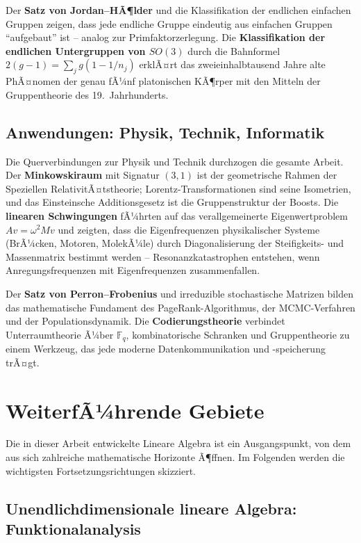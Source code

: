 ﻿\documentclass[a4paper,12pt]{report}
\theoremstyle{definition}
\begin{document}
Der \textbf{Satz von Jordan--HÃ¶lder} und die Klassifikation der
endlichen einfachen Gruppen zeigen, dass jede endliche Gruppe
eindeutig aus einfachen Gruppen ``aufgebaut'' ist -- analog zur
Primfaktorzerlegung. Die \textbf{Klassifikation der endlichen
Untergruppen von $SO(3)$} durch die Bahnformel
$2(g-1) = \sum_j g(1 - 1/n_j)$ erklÃ¤rt das zweieinhalbtausend
Jahre alte PhÃ¤nomen der genau fÃ¼nf platonischen KÃ¶rper mit den
Mitteln der Gruppentheorie des 19.~Jahrhunderts.

\subsection*{Anwendungen: Physik, Technik, Informatik}

Die Querverbindungen zur Physik und Technik durchzogen die gesamte
Arbeit. Der \textbf{Minkowskiraum} mit Signatur $(3,1)$ ist der
geometrische Rahmen der Speziellen RelativitÃ¤tstheorie;
Lorentz-Transformationen sind seine Isometrien, und das
Einsteinsche Additionsgesetz ist die Gruppenstruktur der Boosts.
Die \textbf{linearen Schwingungen} fÃ¼hrten auf das verallgemeinerte
Eigenwertproblem $Av = \omega^2 Mv$ und zeigten, dass die
Eigenfrequenzen physikalischer Systeme (BrÃ¼cken, Motoren, MolekÃ¼le)
durch Diagonalisierung der Steifigkeits- und Massenmatrix bestimmt
werden -- Resonanzkatastrophen entstehen, wenn Anregungsfrequenzen
mit Eigenfrequenzen zusammenfallen.

Der \textbf{Satz von Perron--Frobenius} und irreduzible stochastische
Matrizen bilden das mathematische Fundament des PageRank-Algorithmus,
der MCMC-Verfahren und der Populationsdynamik. Die \textbf{Codierungstheorie}
verbindet Unterraumtheorie Ã¼ber $\mathbb{F}_q$, kombinatorische
Schranken und Gruppentheorie zu einem Werkzeug, das jede moderne
Datenkommunikation und -speicherung trÃ¤gt.

\section{WeiterfÃ¼hrende Gebiete}

Die in dieser Arbeit entwickelte Lineare Algebra ist ein
Ausgangspunkt, von dem aus sich zahlreiche mathematische
Horizonte Ã¶ffnen. Im Folgenden werden die wichtigsten
Fortsetzungsrichtungen skizziert.

\subsection*{Unendlichdimensionale lineare Algebra: Funktionalanalysis}
\end{document}
